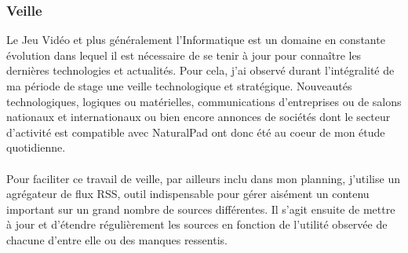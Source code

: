 	\subsubsection{Veille}
Le Jeu Vidéo et plus généralement l'Informatique est un domaine en constante évolution dans lequel il est nécessaire de se tenir à jour pour connaître les dernières technologies et actualités. Pour cela, j'ai observé durant l'intégralité de ma période de stage une veille technologique et stratégique. Nouveautés technologiques, logiques ou matérielles, communications d'entreprises ou de salons nationaux et internationaux ou bien encore annonces de sociétés dont le secteur d'activité est compatible avec NaturalPad ont donc été au coeur de mon étude quotidienne.
\paragraph{}Pour faciliter ce travail de veille, par ailleurs inclu dans mon planning, j'utilise un agrégateur de flux RSS, outil indispensable pour gérer aisément un contenu important sur un grand nombre de sources différentes. Il s'agit ensuite de mettre à jour et d'étendre régulièrement les sources en fonction de l'utilité observée de chacune d'entre elle ou des manques ressentis. 
